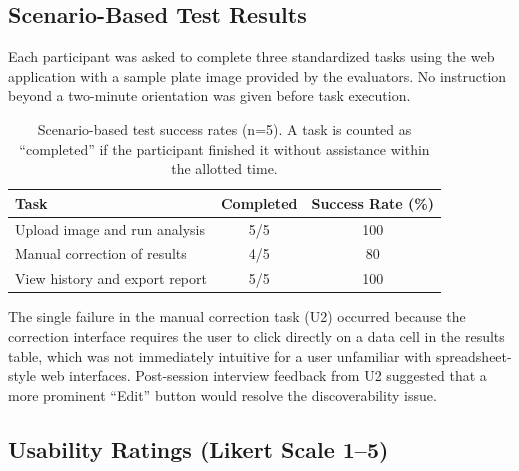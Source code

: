 \subsection{Scenario-Based Test Results}

Each participant was asked to complete three standardized tasks using the web application
with a sample plate image provided by the evaluators.
No instruction beyond a two-minute orientation was given before task execution.

\begin{table}[H]
  \centering
  \caption{Scenario-based test success rates (n=5).
           A task is counted as ``completed'' if the participant finished it
           without assistance within the allotted time.}
  \label{tab:scenario}
  \begin{tabular}{lcc}
    \toprule
    \textbf{Task} & \textbf{Completed} & \textbf{Success Rate (\%)} \\
    \midrule
    Upload image and run analysis      & 5/5 & 100 \\
    Manual correction of results       & 4/5 & 80  \\
    View history and export report     & 5/5 & 100 \\
    \bottomrule
  \end{tabular}
\end{table}

The single failure in the manual correction task (U2) occurred because
the correction interface requires the user to click directly on a data cell in the results table,
which was not immediately intuitive for a user unfamiliar with spreadsheet-style web interfaces.
Post-session interview feedback from U2 suggested that a more prominent
``Edit'' button would resolve the discoverability issue.

\subsection{Usability Ratings (Likert Scale 1--5)}

